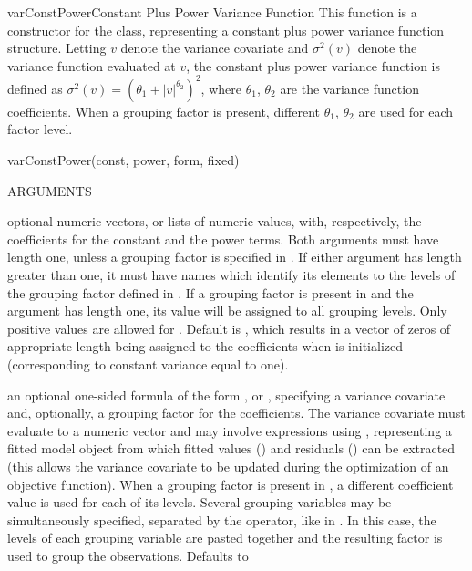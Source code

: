 \documentclass[pdftex]{article} \usepackage{url,graphicx}
\renewcommand{\Twiddle}{\mbox{\(\sim\)}}
\begin{document}
\begin{Helpfile}{varConstPower}{Constant Plus Power Variance Function}
This function is a constructor for the  class,
representing a constant plus power variance function
structure. Letting $v$ denote the variance covariate and
$\sigma^2(v)$ denote the variance function evaluated at
$v$, the constant plus power variance function is defined as
$\sigma^2(v) = \left(\theta_1 + |v|^{\theta_2}\right)^2$,
where $\theta_1$, $\theta_2$ are the variance  
function coefficients. When a grouping factor is present, different
$\theta_1$, $\theta_2$ are used for each factor level.
\begin{Example}
varConstPower(const, power, form, fixed)
\end{Example}
\begin{Argument}{ARGUMENTS}
\item[\Co{const, power:}]
optional numeric vectors, or lists of numeric
values, with, respectively, the coefficients for the constant 
and the power terms. Both arguments must have length one, unless a
grouping factor is specified in . If either argument has
length greater than one, it must have names which identify its
elements to the levels of the grouping factor defined in
. If a grouping factor is present in 
 and the argument has length one, its value will be
assigned to all grouping levels. Only positive values are allowed
for . Default is , which
results in a vector of zeros of appropriate length being assigned to
the coefficients when  is initialized (corresponding
to constant variance equal to one).
\item[\Co{form:}] an optional one-sided formula of the form
  \Co{\Twiddle v}, or \Co{\Twiddle v | g}, specifying a variance
  covariate  and, optionally, a grouping factor  for the
  coefficients. The variance covariate must evaluate to a numeric
  vector and may involve expressions using , representing a
  fitted model object from which fitted values () and
  residuals () can be extracted (this allows the variance
  covariate to be updated during the optimization of an objective
  function). When a grouping factor is present in , a
  different coefficient value is used for each of its levels. Several
  grouping variables may be simultaneously specified, separated by the
  \Co{*} operator, like in \Co{{\Twiddle} v | g1 * g2 * g3}. In this
  case, the levels of each grouping variable are pasted together and
  the resulting factor is used to group the observations. Defaults to

\end{Argument}
\end{Helpfile}
\end{document}
